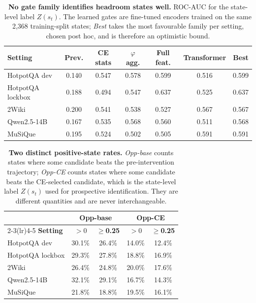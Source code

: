 \begin{table}[t]
\centering
\small
\caption{\textbf{No gate family identifies headroom states well.}
ROC-AUC for the state-level label $Z(s_t)$. The learned gates are
fine-tuned encoders trained on the same 2{,}368 training-split states;
\emph{Best} takes the most favourable family per setting, chosen post
hoc, and is therefore an optimistic bound.}
\label{tab:allgates}
\begin{tabular}{lcccccc}
\toprule
\textbf{Setting} & \textbf{Prev.} & \textbf{CE stats} & \textbf{$\varphi$ agg.} & \textbf{Full feat.} & \textbf{Transformer} & \textbf{Best} \\
\midrule
HotpotQA dev & 0.140 & 0.547 & 0.578 & 0.599 & 0.516 & 0.599 \\
HotpotQA lockbox & 0.188 & 0.494 & 0.547 & 0.637 & 0.525 & 0.637 \\
2Wiki & 0.200 & 0.541 & 0.538 & 0.527 & 0.567 & 0.567 \\
Qwen2.5-14B & 0.167 & 0.535 & 0.568 & 0.560 & 0.511 & 0.568 \\
MuSiQue & 0.195 & 0.524 & 0.502 & 0.505 & 0.591 & 0.591 \\
\bottomrule
\end{tabular}
\end{table}

\begin{table}[t]
\centering
\small
\caption{\textbf{Two distinct positive-state rates.}
\emph{Opp-base} counts states where some candidate beats the
pre-intervention trajectory; \emph{Opp-CE} counts states where some
candidate beats the CE-selected candidate, which is the state-level
label $Z(s_t)$ used for prospective identification. They are different
quantities and are never interchangeable.}
\label{tab:oppdefs}
\begin{tabular}{lcccc}
\toprule
& \multicolumn{2}{c}{\textbf{Opp-base}} & \multicolumn{2}{c}{\textbf{Opp-CE}} \\
\cmidrule(lr){2-3}\cmidrule(lr){4-5}
\textbf{Setting} & \textbf{$>0$} & \textbf{$\ge$0.25} & \textbf{$>0$} & \textbf{$\ge$0.25} \\
\midrule
HotpotQA dev & 30.1\% & 26.4\% & 14.0\% & 12.4\% \\
HotpotQA lockbox & 29.3\% & 27.8\% & 18.8\% & 16.9\% \\
2Wiki & 26.4\% & 24.8\% & 20.0\% & 17.6\% \\
Qwen2.5-14B & 32.1\% & 29.1\% & 16.7\% & 14.3\% \\
MuSiQue & 21.8\% & 18.8\% & 19.5\% & 16.1\% \\
\bottomrule
\end{tabular}
\end{table}

